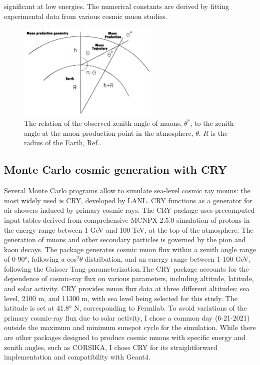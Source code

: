 significant at low energies. The numerical constants are derived by fitting experimental data from various cosmic muon studies.
\begin{figure}[!h]
    \centering
    \includegraphics[width =0.6\textwidth]{figures/png/Screenshot_20240526_140716.png}
    \caption[The relation of $\theta^*$ to $\theta$.]{The relation of the observed zenith angle of muons, $\theta^*$, to 
    the zenith angle at the muon production point in the atmosphere, $\theta$. 
    $R$ is the radius of the Earth, Ref.\cite{guan2015parametrization}.}
    \label{fig:anglesinmuon}
\end{figure}

\subsection{Monte Carlo cosmic generation with CRY}
Several Monte Carlo programs allow to simulate sea-level 
cosmic ray mouns: the most widely used is CRY, developed 
by LANL. CRY functions as a generator for air showers 
induced by primary cosmic rays. The CRY package uses 
precomputed input tables derived from comprehensive 
MCNPX 2.5.0 simulation of protons in the energy range 
between 1 GeV and 100 TeV, at the top of the atmosphere.
The generation of muons and other secondary particles 
is governed by the pion and kaon decays. The package 
generates cosmic muon flux within a zenith angle range 
of 0-90°, following a cos$^2 \theta$ distribution, and an 
energy range between 1-100 GeV, following the Gaisser 
Tang parameterization.The CRY package accounts for the 
dependence of cosmic-ray flux on various parameters, 
including altitude, latitude, and solar activity. CRY 
provides muon flux data at three different altitudes: 
sea level, 2100 m, and 11300 m, with sea level being 
selected for this study. The latitude is set at 41.8° N, 
corresponding to Fermilab. To avoid variations of the 
primary cosmic-ray flux due to solar activity, I chose 
a common day (6-21-2021) outside the maximum and minimum 
sunspot cycle for the simulation. While there are other 
packages designed to produce cosmic muons with specific 
energy and zenith angles, such as CORSIKA, I chose CRY 
for its straightforward implementation and compatibility with Geant4. 

